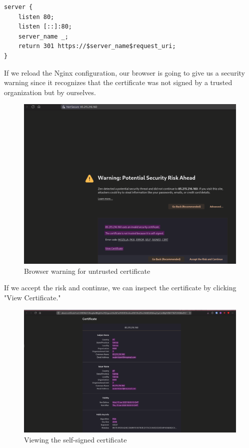 \documentclass[a4paper]{article}
\newcommand{\abc}{\hfill \break}
\begin{document}
\begin{lstlisting}
server {
	listen 80;
	listen [::]:80;
	server_name _;
	return 301 https://$server_name$request_uri;	
}
\end{lstlisting}
If we reload the Nginx configuration, our browser is going to give us a security warning since it recognizes that the certificate was not signed by a trusted organization but by ourselves. \begin{figure}[!htbp]
	\includegraphics[scale=0.25]{images/unseccert.png}
	\centering
	\caption{Browser warning for untrusted certificate}
\end{figure}\abc
If we accept the risk and continue, we can inspect the certificate by clicking "View Certificate."
\begin{figure}[!htbp]
	\includegraphics[scale=0.2]{images/selfcert.png}
	\centering
	\caption{Viewing the self-signed certificate}
\end{figure}
\end{document}
